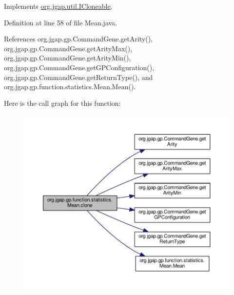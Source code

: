 Implements \hyperlink{interfaceorg_1_1jgap_1_1util_1_1_i_cloneable_aa7e7d62077e6428ad7904932b1b4f7d5}{org.\-jgap.\-util.\-I\-Cloneable}.



Definition at line 58 of file Mean.\-java.



References org.\-jgap.\-gp.\-Command\-Gene.\-get\-Arity(), org.\-jgap.\-gp.\-Command\-Gene.\-get\-Arity\-Max(), org.\-jgap.\-gp.\-Command\-Gene.\-get\-Arity\-Min(), org.\-jgap.\-gp.\-Command\-Gene.\-get\-G\-P\-Configuration(), org.\-jgap.\-gp.\-Command\-Gene.\-get\-Return\-Type(), and org.\-jgap.\-gp.\-function.\-statistics.\-Mean.\-Mean().



Here is the call graph for this function\-:
\nopagebreak
\begin{figure}[H]
\begin{center}
\leavevmode
\includegraphics[width=350pt]{classorg_1_1jgap_1_1gp_1_1function_1_1statistics_1_1_mean_a2c03dec1ec13f4e1c6d0edc536a3b131_cgraph}
\end{center}
\end{figure}


